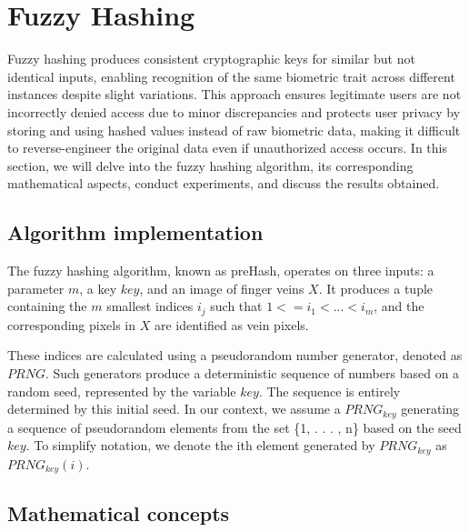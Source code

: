 \section{Fuzzy Hashing}
\label{sec:Fuzzy Hashing}
Fuzzy hashing produces consistent cryptographic keys for similar but not identical inputs, enabling recognition of the same biometric trait across different instances despite slight variations. This approach ensures legitimate users are not incorrectly denied access due to minor discrepancies and protects user privacy by storing and using hashed values instead of raw biometric data, making it difficult to reverse-engineer the original data even if unauthorized access occurs. 
In this section, we will delve into the fuzzy hashing algorithm, its corresponding mathematical aspects, conduct experiments, and discuss the results obtained.
\subsection{Algorithm implementation}


The fuzzy hashing algorithm, known as preHash, operates on three inputs: a parameter $m$, a key $key$, and an image of finger veins $X$. It produces a tuple containing the $m$ smallest indices $i_j$ such that $1 <= i_1 < ... < i_m$, and the corresponding pixels in $X$ are identified as vein pixels.

These indices are calculated using a pseudorandom number generator, denoted as $PRNG$. Such generators produce a deterministic sequence of numbers based on a random seed, represented by the variable $key$. The sequence is entirely determined by this initial seed. In our context, we assume a $PRNG_{key}$ generating a sequence of pseudorandom elements from the set \{1, . . . , n\} based on the seed $key$. To simplify notation, we denote the ith element generated by $PRNG_{key}$ as $PRNG_{key}(i)$.

\subsection{Mathematical concepts}

